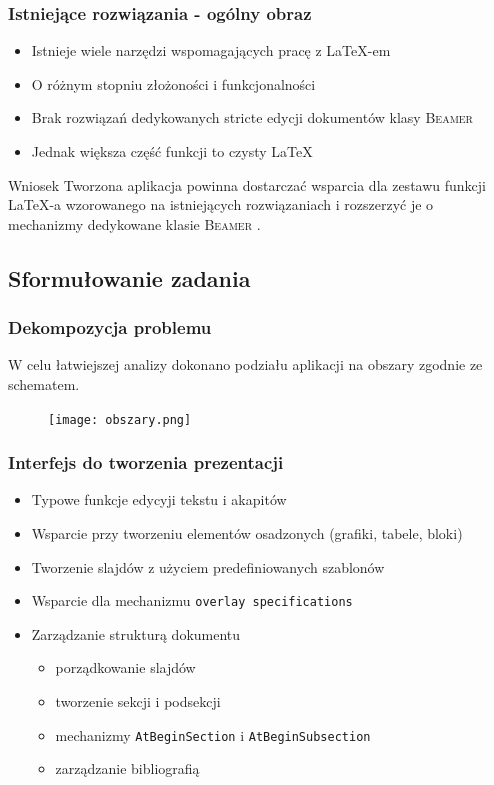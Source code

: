 \documentclass[t]{beamer}
\newcommand{\beamer}{
{\rmfamily\textsc{Beamer}}
}
\begin{document}
\begin{frame}
	\frametitle{Istniejące rozwiązania - ogólny obraz}
	\begin{itemize}
		\item Istnieje wiele narzędzi wspomagających pracę z \LaTeX-em
		\item O różnym stopniu złożoności i funkcjonalności
		\item Brak rozwiązań dedykowanych stricte edycji dokumentów klasy \beamer		
		\item Jednak większa część funkcji to czysty \LaTeX
	\end{itemize}
	\begin{block}{Wniosek}
		Tworzona aplikacja powinna dostarczać wsparcia dla zestawu funkcji \LaTeX-a wzorowanego na istniejących rozwiązaniach i rozszerzyć je o mechanizmy dedykowane klasie \beamer.
	\end{block}
\end{frame}

\subsection{Sformułowanie zadania}

\begin{frame}
	\frametitle{Dekompozycja problemu}
	W celu łatwiejszej analizy dokonano podziału aplikacji na obszary zgodnie ze schematem.
	\begin{figure}[htp]
		\centering
		\texttt{[image: obszary.png]}
		\label{obsz}
	\end{figure}
\end{frame}

\begin{frame}
	\frametitle{Interfejs do tworzenia prezentacji}
	\begin{itemize}
		\item Typowe funkcje edycyji tekstu i akapitów
		\item Wsparcie przy tworzeniu elementów osadzonych (grafiki, tabele, bloki)
		\item Tworzenie slajdów z użyciem predefiniowanych szablonów
		\item Wsparcie dla mechanizmu \texttt{overlay specifications}
		\item Zarządzanie strukturą dokumentu
		\begin{itemize}
			\item porządkowanie slajdów
			\item tworzenie sekcji i podsekcji
			\item mechanizmy \texttt{AtBeginSection} i \texttt{AtBeginSubsection}
			\item zarządzanie bibliografią
		\end{itemize}
	\end{itemize}
\end{frame}
\end{document}
